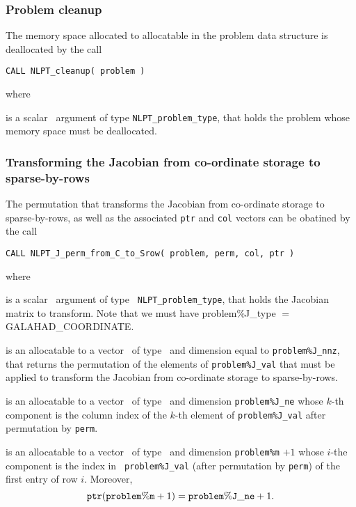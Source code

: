 \documentclass{galahad}
\newcommand{\packagename}{NLPT}
\newcommand{\sym}{\sf\small}
\begin{document}
\subsubsection{Problem cleanup}
\label{cleanup}

The memory space allocated to allocatable in the problem data structure is
deallocated by the call
\vspace*{1mm}

\hspace{8mm}
{\tt CALL \packagename\_cleanup( problem )}

\noindent where
\begin{description}
 is a scalar \intentin\ argument of type {\tt NLPT\_problem\_type},
that holds the problem whose memory space must be deallocated.
\end{description}

\subsubsection{Transforming the Jacobian from co-ordinate storage to
sparse-by-rows}
\label{toSrow}

The permutation that transforms the Jacobian from co-ordinate 
storage to sparse-by-rows, as well as the associated {\tt ptr} and {\tt col}
vectors can be obatined by the call
\vspace*{1mm}

\hspace{8mm}
{\tt CALL \packagename\_J\_perm\_from\_C\_to\_Srow( problem, perm, col, ptr )}

\noindent where
\begin{description}
 is a scalar \intentin\ argument of type {\tt
NLPT\_problem\_type}, that holds the Jacobian matrix to transform. Note that
we must have {problem\%J\_type} $=$ {\sym GALAHAD\_COORDINATE}.

 is an allocatable to a vector \intentout\ of type \integer\ and
dimension equal to {\tt problem\%J\_nnz}, that returns the permutation of the
elements of {\tt problem\%J\_val} that must be applied to transform the
Jacobian from co-ordinate storage to sparse-by-rows.

 is an allocatable to a vector \intentout\ of type \integer\ and
dimension {\tt problem\%J\_ne} whose $k$-th component is the column index of 
the $k$-th element of {\tt problem\%J\_val} after permutation by {\tt perm}.

 is an allocatable to a vector \intentout\ of type \integer\ and
dimension {\tt problem\%m} $+1$ whose $i$-the component is the index in {\tt
problem\%J\_val} (after permutation by {\tt perm}) of the first entry of row
$i$. Moreover,
\[
{\tt ptr}({\tt problem\%m}+1 ) = {\tt problem\%J\_ne} + 1.
\]
\end{description}
\end{document}
